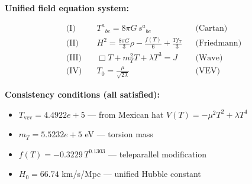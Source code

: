 
\textbf{Unified field equation system:}

\begin{align}
  \text{(I)} \quad & T^a{}_{bc} = 8\pi G \, s^a{}_{bc} && \text{(Cartan)} \\
  \text{(II)} \quad & H^2 = \frac{8\pi G}{3}\rho - \frac{f(T)}{6} + \frac{Tf_T}{3} && \text{(Friedmann)} \\
  \text{(III)} \quad & \Box T + m_T^2 T + \lambda T^3 = J && \text{(Wave)} \\
  \text{(IV)} \quad & T_0 = \frac{\mu}{\sqrt{2\lambda}} && \text{(VEV)}
\end{align}

\textbf{Consistency conditions (all satisfied):}
\begin{itemize}
  \item $T_{\text{vev}} = 4.4922e+5$ — from Mexican hat $V(T) = -\mu^2 T^2 + \lambda T^4$
  \item $m_T = 5.5232e+5$ eV — torsion mass
  \item $f(T) = -0.3229 \, T^{0.1303}$ — teleparallel modification
  \item $H_0 = 66.74$ km/s/Mpc — unified Hubble constant
\end{itemize}